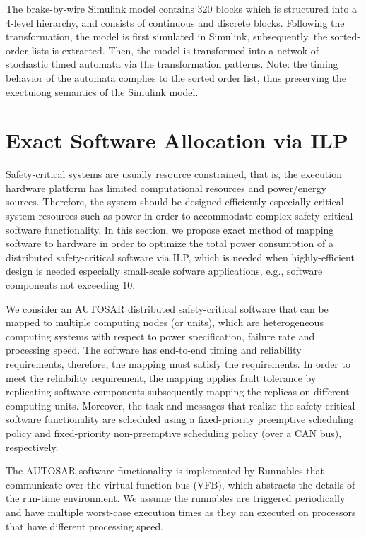 The brake-by-wire Simulink model contains 320 blocks which is structured into a 4-level hierarchy, and consists of continuous and discrete blocks. Following the transformation, the model is first simulated in Simulink, subsequently, the sorted-order lists is extracted. Then, the model is transformed into a netwok of stochastic timed automata via the transformation patterns. Note: the timing behavior of the automata complies to the sorted order list, thus preserving the exectuiong semantics of the Simulink model.

\section{Exact Software Allocation  via ILP}\label{rc_ilp}
Safety-critical systems are usually resource constrained, that is, the execution hardware platform has limited computational resources and power/energy sources. Therefore, the system should be designed efficiently especially critical system resources such as power in order to accommodate complex safety-critical software functionality. In this section, we propose exact method of mapping software to hardware in order to optimize the total power consumption of a distributed safety-critical software via ILP, which is needed when highly-efficient design is needed especially small-scale sofware applications, e.g., software components not exceeding 10.

We consider an AUTOSAR distributed safety-critical software that can be mapped to multiple computing nodes (or units), which are heterogeneous computing systems with respect to power specification, failure rate and processing speed. The software has end-to-end timing and reliability requirements, therefore, the mapping must satisfy the requirements. In order to meet the reliability requirement, the mapping applies fault tolerance by replicating software components subsequently mapping the replicas on different computing units. Moreover, the task and messages that realize the safety-critical software functionality are scheduled using a fixed-priority preemptive scheduling policy and fixed-priority non-preemptive scheduling policy (over a  CAN bus), respectively.

The AUTOSAR software functionality is implemented by Runnables that communicate over the virtual function bus (VFB), which abstracts the details of the run-time environment. We assume the runnables are triggered periodically and have multiple worst-case execution times as they can executed on processors that have different processing speed.

